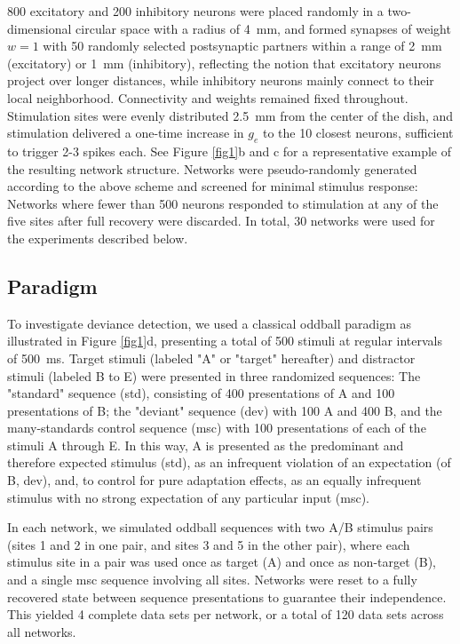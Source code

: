 \documentclass[pdflatex,referee,iicol,sn-basic]{sn-jnl}
\theoremstyle{thmstyleone}%
\theoremstyle{thmstyletwo}%
\theoremstyle{thmstylethree}%
\begin{document}
800 excitatory and 200 inhibitory neurons were placed randomly in a two-dimensional circular space with a radius of 4~mm, and formed synapses of weight $w = 1$ with 50 randomly selected postsynaptic partners within a range of 2~mm (excitatory) or 1~mm (inhibitory), reflecting the notion that excitatory neurons project over longer distances, while inhibitory neurons mainly connect to their local neighborhood. Connectivity and weights remained fixed throughout. Stimulation sites were evenly distributed 2.5~mm from the center of the dish, and stimulation delivered a one-time increase in $g_e$ to the 10 closest neurons, sufficient to trigger 2-3 spikes each. See Figure \ref{fig1}b and c for a representative example of the resulting network structure. Networks were pseudo-randomly generated according to the above scheme and screened for minimal stimulus response: Networks where fewer than 500 neurons responded to stimulation at any of the five sites after full recovery were discarded. In total, 30 networks were used for the experiments described below.

\subsection{Paradigm}\label{sec-paradigm}

To investigate deviance detection, we used a classical oddball paradigm as illustrated in Figure \ref{fig1}d, presenting a total of 500 stimuli at regular intervals of 500~ms. Target stimuli (labeled "A" or "target" hereafter) and distractor stimuli (labeled B to E) were presented in three randomized sequences: The "standard" sequence (std), consisting of 400 presentations of A and 100 presentations of B; the "deviant" sequence (dev) with 100 A and 400 B, and the many-standards control sequence (msc) with 100 presentations of each of the stimuli A through E. In this way, A is presented as the predominant and therefore expected stimulus (std), as an infrequent violation of an expectation (of B, dev), and, to control for pure adaptation effects, as an equally infrequent stimulus with no strong expectation of any particular input (msc).

In each network, we simulated oddball sequences with two A/B stimulus pairs (sites 1 and 2 in one pair, and sites 3 and 5 in the other pair), where each stimulus site in a pair was used once as target (A) and once as non-target (B), and a single msc sequence involving all sites. Networks were reset to a fully recovered state between sequence presentations to guarantee their independence. This yielded 4 complete data sets per network, or a total of 120 data sets across all networks.
\end{document}
